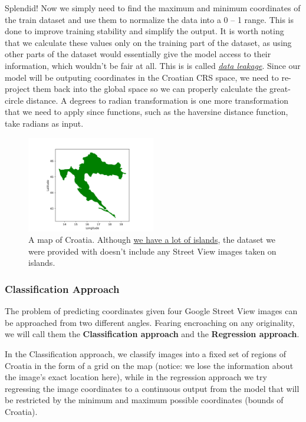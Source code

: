 \documentclass[]{article}
\begin{document}
Splendid! Now we simply need to find the maximum and minimum coordinates
of the train dataset and use them to normalize the data into a 0 -- 1
range. This is done to improve training stability and simplify the
output. It is worth noting that we calculate these values only on the
training part of the dataset, as using other parts of the dataset would
essentially give the model access to their information, which wouldn't
be fair at all. This is is called
\href{https://machinelearningmastery.com/data-leakage-machine-learning/}{\emph{data
leakage}}. Since our model will be outputing coordinates in the Croatian
CRS space, we need to re-project them back into the global space so we
can properly calculate the great-circle distance. A degrees to radian
transformation is one more transformation that we need to apply since
functions, such as the haversine distance function, take radians as
input.

\begin{figure}
\centering
\includegraphics[width=0.5\textwidth,height=\textheight]{./tex2pdf.-3ffa51a14b505aec/c011024054eedb05f8c4d5b7b936826832abc4ed.png}
\caption{A map of Croatia. Although
\href{https://www.google.com/maps/@44.2652721,16.2377694,8.25z}{we have
a lot of islands}, the dataset we were provided with doesn't include any
Street View images taken on islands.}
\end{figure}

\hypertarget{classification-approach}{%
\subsubsection{Classification Approach}\label{classification-approach}}

The problem of predicting coordinates given four Google Street View
images can be approached from two different angles. Fearing encroaching
on any originality, we will call them the \textbf{Classification
approach} and the \textbf{Regression approach}.

In the Classification approach, we classify images into a fixed set of
regions of Croatia in the form of a grid on the map (notice: we lose the
information about the image's exact location here), while in the
regression approach we try regressing the image coordinates to a
continuous output from the model that will be restricted by the minimum
and maximum possible coordinates (bounds of Croatia).
\end{document}
